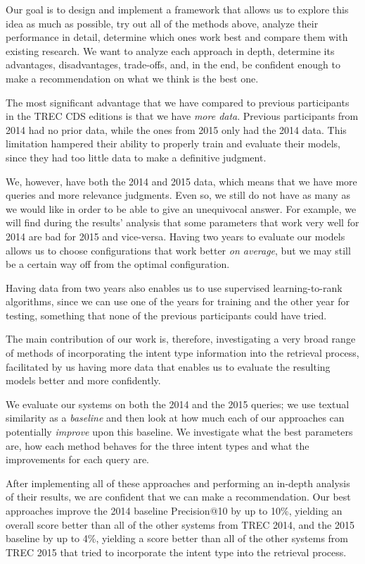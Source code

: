 Our goal is to design and implement a framework that allows us
to explore this idea as much as possible, try out all of the methods above, 
analyze their performance in detail,
determine which ones work best and compare them with existing research.
We want to analyze each approach in depth, determine its advantages, disadvantages, trade-offs,
and, in the end, be confident enough to make a recommendation on what we think is the best one.

The most significant advantage that we have compared to previous participants in the TREC CDS editions is 
that we have \emph{more data}. Previous participants from 2014 had no prior data, while the ones from 2015
only had the 2014 data. This limitation hampered their ability to properly train and evaluate their models, since they
had too little data to make a definitive judgment. 

We, however, have both the 2014 and 2015 data, which means that
we have more queries and more relevance judgments.
Even so, we still do not have as many as we would like in order to be able to give an unequivocal answer.
For example, we will find during the results' analysis
that some parameters that work very well for 2014 are bad for 2015 and vice-versa. Having two
years to evaluate our models allows us to choose configurations that work better \emph{on average}, but we
may still be a certain way off from the optimal configuration.

Having data from two years also
enables us to use supervised learning-to-rank algorithms,
since we can use one of the years for training and the other year for testing,
something that none of the previous participants could have tried.

The main contribution of our work is, therefore, investigating a very broad range of methods of incorporating
the intent type information into the retrieval process, 
facilitated by us having more data that enables us to evaluate the resulting models better and more confidently.

We evaluate our systems on both the 2014 and the 2015 queries; we use textual similarity
as a \emph{baseline} and then look at how much each of our approaches can potentially \emph{improve} upon this baseline.
We investigate what the best parameters are, how each method behaves for the three
intent types and what the improvements for each query are.

After implementing all of these approaches and performing an in-depth analysis of their results,
we are confident that we can make a recommendation.
Our best approaches improve the 2014 baseline Precision@10 by up to 10\%, yielding an overall 
score better than all of the other systems from TREC 2014,
and the 2015 baseline by up to 4\%, yielding a score better than all of the other systems from TREC 2015 that tried to incorporate the intent
type into the retrieval process.

